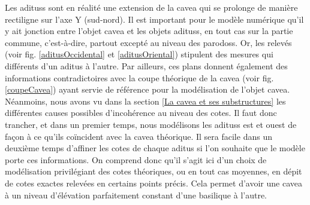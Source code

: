 Les \glspl{aditus} sont en réalité une extension de la \gls{cavea} qui se prolonge de manière rectiligne sur l'axe Y (sud-nord). Il est important pour le modèle numérique qu'il y ait jonction entre l'objet \gls{cavea} et les objets \glspl{aditus}, en tout cas sur la partie commune, c'est-à-dire, partout excepté au niveau des \glspl{parodos}. Or, les relevés (voir fig. \ref{aditusOccidental} et \ref{aditusOriental}) stipulent des mesures qui différents d'un \gls{aditus} à l'autre. Par ailleurs, ces plans donnent également des informations contradictoires avec la coupe théorique de la \gls{cavea} (voir fig. \ref{coupeCavea}) ayant servie de référence pour la modélisation de l'objet \gls{cavea}. Néanmoins, nous avons vu dans la section \ref{La cavea et ses substructures} les différentes causes possibles d'incohérence au niveau des cotes. Il faut donc trancher, et dans un premier temps, nous modélisons les \glspl{aditus} est et ouest de façon à ce qu'ils coïncident avec la \gls{cavea} théorique. Il sera facile dans un deuxième temps d'affiner les cotes de chaque  \gls{aditus} si l'on souhaite que le modèle porte ces informations. On comprend donc qu'il s'agit ici d'un choix de modélisation privilégiant des cotes théoriques, ou en tout cas moyennes, en dépit de cotes exactes relevées en certains points précis. Cela permet d'avoir une \gls{cavea} à un niveau d'élévation parfaitement constant d'une \gls{basilique} à l'autre. 

